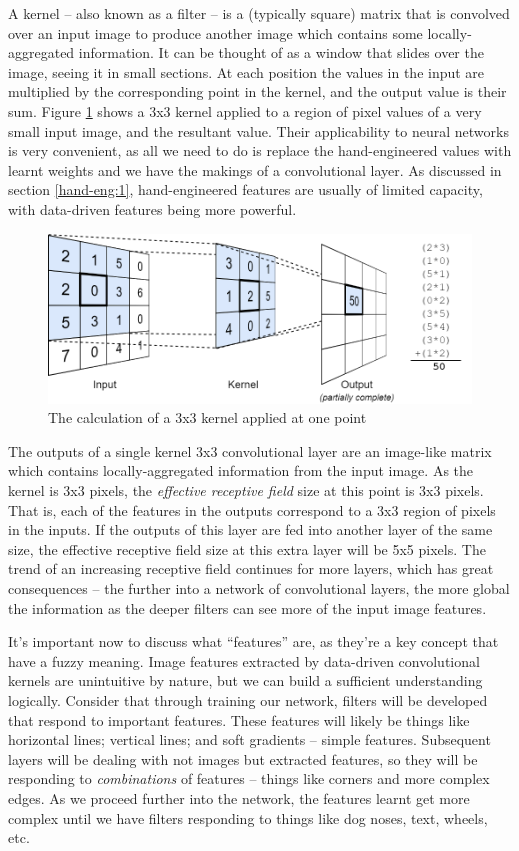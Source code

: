 \documentclass{report}
\begin{document}
	A kernel -- also known as a filter -- is a (typically square) matrix that is convolved over an input image to produce another image which contains some locally-aggregated information. It can be thought of as a window that slides over the image, seeing it in small sections. At each position the values in the input are multiplied by the corresponding point in the kernel, and the output value is their sum. Figure \ref{fig:kernel:1} shows a 3x3 kernel applied to a region of pixel values of a very small input image, and the resultant value. Their applicability to neural networks is very convenient, as all we need to do is replace the hand-engineered values with learnt weights and we have the makings of a convolutional layer. As discussed in section \ref{hand-eng:1}, hand-engineered features are usually of limited capacity, with data-driven features being more powerful. \par
	\begin{figure}[!h]
		\centering
		\includegraphics[width=12cm]{kernelimg}
		\caption{The calculation of a 3x3 kernel applied at one point}
		\label{fig:kernel:1}
	\end{figure}
	The outputs of a single kernel 3x3 convolutional layer are an image-like matrix which contains locally-aggregated information from the input image. As the kernel is 3x3 pixels, the \textit{effective receptive field} size at this point is 3x3 pixels. That is, each of the features in the outputs correspond to a 3x3 region of pixels in the inputs. If the outputs of this layer are fed into another layer of the same size, the effective receptive field size at this extra layer will be 5x5 pixels. The trend of an increasing receptive field continues for more layers, which has great consequences -- the further into a network of convolutional layers, the more global the information as the deeper filters can see more of the input image features. \par
	It's important now to discuss what ``features'' are, as they're a key concept that have a fuzzy meaning. Image features extracted by data-driven convolutional kernels are unintuitive by nature, but we can build a sufficient understanding logically. Consider that through training our network, filters will be developed that respond to important features. These features will likely be things like horizontal lines; vertical lines; and soft gradients -- simple features. Subsequent layers will be dealing with not images but extracted features, so they will be responding to \textit{combinations} of features -- things like corners and more complex edges. As we proceed further into the network, the features learnt get more complex until we have filters responding to things like dog noses, text, wheels, etc. \par
\end{document}
